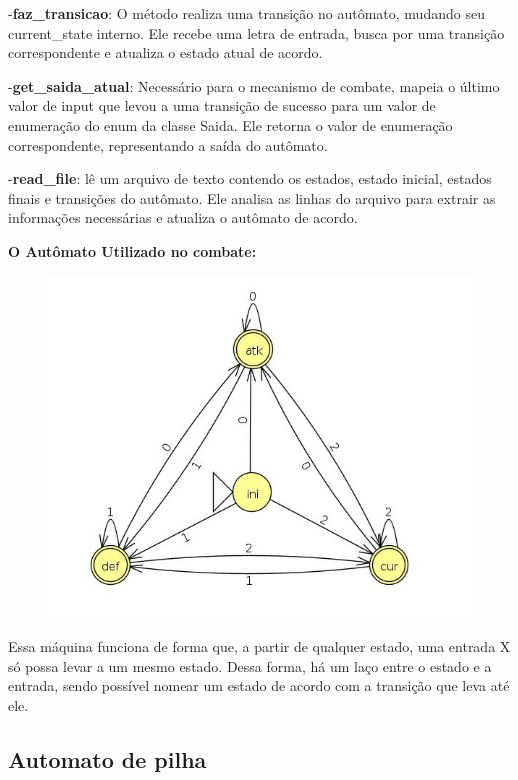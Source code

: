 \documentclass[12pt]{article}
\begin{document}
-\textbf{faz\_transicao}: O método  realiza uma transição no autômato, mudando seu current\_state interno. Ele recebe uma letra de entrada, busca por uma transição correspondente e atualiza o estado atual de acordo.

-\textbf{get\_saida\_atual}: Necessário para o mecanismo de combate, mapeia o último valor de input que levou a uma transição de sucesso para um valor de enumeração do enum da classe Saida. Ele retorna o valor de enumeração correspondente, representando a saída do autômato.

-\textbf{read\_file}: lê um arquivo de texto contendo os estados, estado inicial, estados finais e transições do autômato. Ele analisa as linhas do arquivo para extrair as informações necessárias e atualiza o autômato de acordo.

\textbf{O Autômato Utilizado no combate:}
\begin{figure}[!h]
  \centering
  \includegraphics[width=0.50\linewidth]{combate.jpg}
\end{figure}

Essa máquina funciona de forma que, a partir de qualquer estado, uma entrada X só possa levar a um mesmo estado. Dessa forma, há um laço entre o estado e a entrada, sendo possível nomear um estado de acordo com a transição que leva até ele.
\newpage
\subsection{Automato de pilha}
\end{document}
